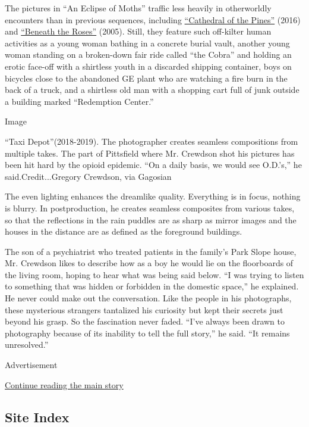 The pictures in ``An Eclipse of Moths'' traffic less heavily in
otherworldly encounters than in previous sequences, including
\href{https://gagosian.com/exhibitions/2016/gregory-crewdson-cathedral-of-the-pines/}{``Cathedral
of the Pines''} (2016) and
\href{https://gagosian.com/exhibitions/2005/gregory-crewdson-beneath-the-roses/}{``Beneath
the Roses''} (2005). Still, they feature such off-kilter human
activities as a young woman bathing in a concrete burial vault, another
young woman standing on a broken-down fair ride called ``the Cobra'' and
holding an erotic face-off with a shirtless youth in a discarded
shipping container, boys on bicycles close to the abandoned GE plant who
are watching a fire burn in the back of a truck, and a shirtless old man
with a shopping cart full of junk outside a building marked ``Redemption
Center.''

Image

``Taxi Depot''(2018-2019). The photographer creates seamless
compositions from multiple takes. The part of Pittsfield where Mr.
Crewdson shot his pictures has been hit hard by the opioid epidemic.
``On a daily basis, we would see O.D.'s,'' he said.Credit...Gregory
Crewdson, via Gagosian

The even lighting enhances the dreamlike quality. Everything is in
focus, nothing is blurry. In postproduction, he creates seamless
composites from various takes, so that the reflections in the rain
puddles are as sharp as mirror images and the houses in the distance are
as defined as the foreground buildings.

The son of a psychiatrist who treated patients in the family's Park
Slope house, Mr. Crewdson likes to describe how as a boy he would lie on
the floorboards of the living room, hoping to hear what was being said
below. ``I was trying to listen to something that was hidden or
forbidden in the domestic space,'' he explained. He never could make out
the conversation. Like the people in his photographs, these mysterious
strangers tantalized his curiosity but kept their secrets just beyond
his grasp. So the fascination never faded. ``I've always been drawn to
photography because of its inability to tell the full story,'' he said.
``It remains unresolved.''

Advertisement

\protect\hyperlink{after-bottom}{Continue reading the main story}

\hypertarget{site-index}{%
\subsection{Site Index}\label{site-index}}

